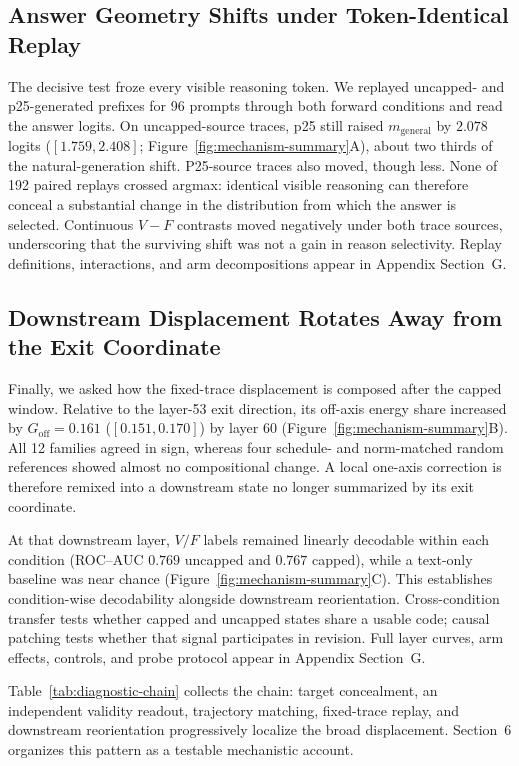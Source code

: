 \documentclass[letterpaper]{article} %
\begin{document}
\subsection{Answer Geometry Shifts under Token-Identical Replay}

The decisive test froze every visible reasoning token. We replayed uncapped- and p25-generated prefixes for 96 prompts through both forward conditions and read the answer logits. On uncapped-source traces, p25 still raised $m_{\mathrm{general}}$ by $2.078$ logits ($[1.759,2.408]$; Figure~\ref{fig:mechanism-summary}A), about two thirds of the natural-generation shift. P25-source traces also moved, though less. None of 192 paired replays crossed argmax: identical visible reasoning can therefore conceal a substantial change in the distribution from which the answer is selected. Continuous $V-F$ contrasts moved negatively under both trace sources, underscoring that the surviving shift was not a gain in reason selectivity. Replay definitions, interactions, and arm decompositions appear in Appendix Section~G.

\subsection{Downstream Displacement Rotates Away from the Exit Coordinate}

Finally, we asked how the fixed-trace displacement is composed after the capped window. Relative to the layer-53 exit direction, its off-axis energy share increased by $G_{\mathrm{off}}=0.161$ ($[0.151,0.170]$) by layer 60 (Figure~\ref{fig:mechanism-summary}B). All 12 families agreed in sign, whereas four schedule- and norm-matched random references showed almost no compositional change. A local one-axis correction is therefore remixed into a downstream state no longer summarized by its exit coordinate.

At that downstream layer, $V/F$ labels remained linearly decodable within each condition (ROC--AUC $0.769$ uncapped and $0.767$ capped), while a text-only baseline was near chance (Figure~\ref{fig:mechanism-summary}C). This establishes condition-wise decodability alongside downstream reorientation. Cross-condition transfer tests whether capped and uncapped states share a usable code; causal patching tests whether that signal participates in revision. Full layer curves, arm effects, controls, and probe protocol appear in Appendix Section~G.

Table~\ref{tab:diagnostic-chain} collects the chain: target concealment, an independent validity readout, trajectory matching, fixed-trace replay, and downstream reorientation progressively localize the broad displacement. Section~6 organizes this pattern as a testable mechanistic account.
\end{document}
